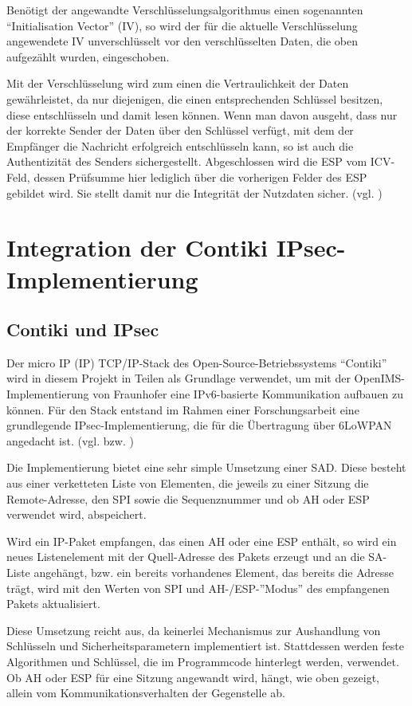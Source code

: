 Benötigt der angewandte Verschlüsselungsalgorithmus einen sogenannten “Initialisation Vector” (IV), so wird der für die aktuelle Verschlüsselung angewendete IV unverschlüsselt vor den verschlüsselten Daten, die oben aufgezählt wurden, eingeschoben.

Mit der Verschlüsselung wird zum einen die Vertraulichkeit der Daten gewährleistet, da nur diejenigen, die einen entsprechenden Schlüssel besitzen, diese entschlüsseln und damit lesen können. Wenn man davon ausgeht, dass nur der korrekte Sender der Daten über den Schlüssel verfügt, mit dem der Empfänger die Nachricht erfolgreich entschlüsseln kann, so ist auch die Authentizität des Senders sichergestellt.
Abgeschlossen wird die ESP vom ICV-Feld, dessen Prüfsumme hier lediglich über die vorherigen Felder des ESP gebildet wird. Sie stellt damit nur die Integrität der Nutzdaten sicher.
(vgl. \cite{RFC4303})

\section{Integration der Contiki IPsec-Implementierung}

\subsection{Contiki und IPsec}
Der micro IP (\textmu IP) TCP/IP-Stack des Open-Source-Betriebssystems “Contiki” wird in diesem Projekt in Teilen als Grundlage verwendet, um mit der OpenIMS-Im\-ple\-men\-tierung von Fraunhofer eine IPv6-basierte Kommunikation aufbauen zu können. Für den Stack entstand im Rahmen einer Forschungsarbeit eine grundlegende IPsec-Im\-ple\-men\-tierung, die für die Über\-tra\-gung über 6LoWPAN angedacht ist. (vgl. \cite{raza11ipsec} bzw. \cite{raza11ipsecdemo})

Die Implementierung bietet eine sehr simple Umsetzung einer SAD. Diese besteht aus einer verketteten Liste von Elementen, die jeweils zu einer Sitzung die Remote-Adresse, den SPI sowie die Sequenznummer und ob AH oder ESP verwendet wird, abspeichert.

Wird ein IP-Paket empfangen, das einen AH oder eine ESP enthält, so wird ein neues Listenelement mit der Quell-Adresse des Pakets erzeugt und an die SA-Liste angehängt, bzw. ein bereits vorhandenes Element, das bereits die Adresse trägt, wird mit den Werten von SPI und AH-/ESP-”Modus” des empfangenen Pakets aktualisiert.

Diese Umsetzung reicht aus, da keinerlei Mechanismus zur Aushandlung von Schlüsseln und Sicherheitsparametern implementiert ist. Stattdessen werden feste Algorithmen und Schlüssel, die im Programmcode hinterlegt werden, verwendet. Ob AH oder ESP für eine Sitzung angewandt wird, hängt, wie oben gezeigt, allein vom Kommunikationsverhalten der Gegenstelle ab.

